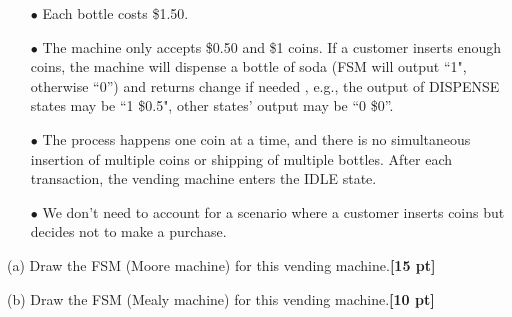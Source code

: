 \documentclass[a4paper]{article}
\begin{document}
\begin{itemize}
    \item[$\bullet$] Each bottle costs \$1.50.
    \item[$\bullet$] The machine only accepts \$0.50 and \$1 coins. If a customer inserts enough coins, the machine will dispense a bottle of soda (FSM will output ``1", otherwise ``0'') and returns change if needed , e.g., the output of DISPENSE states may be ``1 \$0.5", other states' output may be ``0 \$0''.
    \item[$\bullet$] The process happens one coin at a time, and there is no simultaneous insertion of multiple coins or shipping of multiple bottles. After each transaction, the vending machine enters the IDLE state.
    \item[$\bullet$] We don’t need to account for a scenario where a customer inserts coins but decides not to make a purchase.
\end{itemize}


(a) Draw the FSM (Moore machine) for this vending machine.\textbf{[15 pt]}

(b) Draw the FSM (Mealy machine) for this vending machine.\textbf{[10 pt]}
\end{document}

